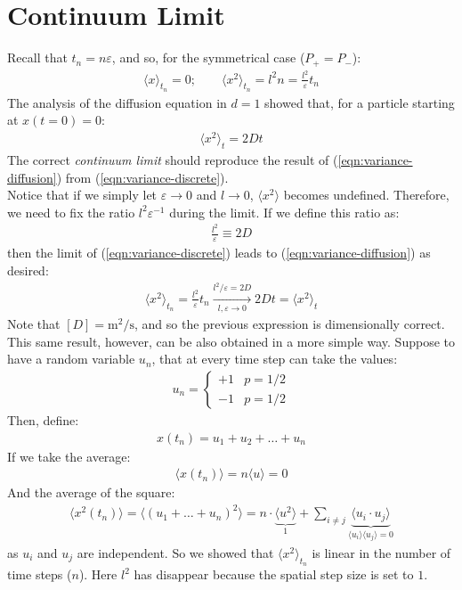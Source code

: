 \documentclass[../template.tex]{subfiles}
\begin{document}
\section{Continuum Limit}
Recall that $t_n = n \varepsilon$, and so, for the symmetrical case ($P_+ = P_-$):
\begin{align}
    \langle x \rangle_{t_n} = 0; \qquad \langle x^2 \rangle_{t_n} = l^2 n = \frac{l^2}{\varepsilon} t_n
    \label{eqn:variance-discrete}
\end{align}
The analysis of the diffusion equation in $d=1$ showed that, for a particle starting at $x(t=0) = 0$: 
\begin{align}
    \langle x^2 \rangle_t = 2Dt
    \label{eqn:variance-diffusion}
\end{align}
The correct \textit{continuum limit} should reproduce the result of (\ref{eqn:variance-diffusion}) from (\ref{eqn:variance-discrete}).\\
Notice that if we simply let $\varepsilon \to 0$ and $l \to 0$, $\langle x^2 \rangle$ becomes undefined. Therefore, we need to fix the ratio $l^2 \varepsilon^{-1}$ during the limit. If we define this ratio as:
\begin{align*}
    \frac{l^2}{\varepsilon} \equiv 2D 
\end{align*}    
then the limit of (\ref{eqn:variance-discrete}) leads to (\ref{eqn:variance-diffusion}) as desired:
\begin{align*}
    \langle x^2 \rangle_{t_n} = \frac{l^2}{\varepsilon} t_n  \xrightarrow[l,\varepsilon \to 0]{l^2/\varepsilon = 2D} 2Dt = \langle x^2 \rangle_t  
\end{align*}
Note that $[D]=\si{\m\squared\per\s}$, and so the previous expression is dimensionally correct.\\

This same result, however, can be also obtained in a more simple way. Suppose to have a random variable $u_n$, that at every time step can take the values: 
\begin{align*}
    u_n = \begin{cases}
        +1 & p = 1/2\\
        -1 & p = 1/2
    \end{cases}
\end{align*} 
Then, define: 
\begin{align*}
    x(t_n) = u_1 + u_2 + \dots + u_n
\end{align*}
If we take the average: 
\begin{align*}
    \langle x(t_n) \rangle = n\langle u \rangle = 0
\end{align*}
And the average of the square: 
\begin{align*}
    \langle x^2 (t_n)\rangle = \langle (u_1 + \dots + u_n)^2 \rangle = n\cdot \underbrace{\langle u^2 \rangle}_{1} + \sum_{i\neq j} \underbrace{\langle u_i \cdot u_j \rangle}_{\langle u_i \rangle \langle u_j\rangle = 0}
\end{align*}
as $u_i$ and $u_j$ are independent. So we showed that $\langle x^2 \rangle_{t_n}$ is linear in the number of time steps ($n$). Here $l^2$ has disappear because the spatial step size is set to $1$.\\
\end{document}
